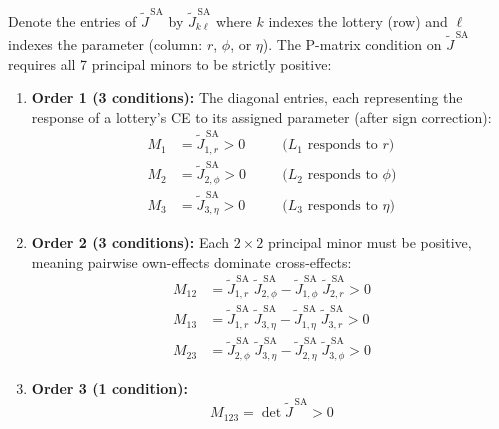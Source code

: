 \documentclass[11pt,a4paper]{article}
\theoremstyle{definition}
\begin{document}
Denote the entries of $\widetilde{J}^{\,\mathrm{SA}}$ by
$\widetilde{J}^{\,\mathrm{SA}}_{k\ell}$ where $k$ indexes the lottery
(row) and $\ell$ indexes the parameter (column: $r$, $\phi$, or $\eta$).
The P-matrix condition on $\widetilde{J}^{\,\mathrm{SA}}$ requires all 7
principal minors to be strictly positive:
\begin{enumerate}
    \item \textbf{Order 1 (3 conditions):} The diagonal entries, each
    representing the response of a lottery's CE to its assigned parameter
    (after sign correction):
    \begin{align}
        M_1 &= \widetilde{J}^{\,\mathrm{SA}}_{1,r} > 0
        &\quad&\text{($L_1$ responds to $r$)} \\
        M_2 &= \widetilde{J}^{\,\mathrm{SA}}_{2,\phi} > 0
        &\quad&\text{($L_2$ responds to $\phi$)} \\
        M_3 &= \widetilde{J}^{\,\mathrm{SA}}_{3,\eta} > 0
        &\quad&\text{($L_3$ responds to $\eta$)}
    \end{align}

    \item \textbf{Order 2 (3 conditions):} Each $2 \times 2$ principal
    minor must be positive, meaning pairwise own-effects dominate
    cross-effects:
    \begin{align}
        M_{12} &= \widetilde{J}^{\,\mathrm{SA}}_{1,r}\;
                   \widetilde{J}^{\,\mathrm{SA}}_{2,\phi}
                 - \widetilde{J}^{\,\mathrm{SA}}_{1,\phi}\;
                   \widetilde{J}^{\,\mathrm{SA}}_{2,r} > 0 \\
        M_{13} &= \widetilde{J}^{\,\mathrm{SA}}_{1,r}\;
                   \widetilde{J}^{\,\mathrm{SA}}_{3,\eta}
                 - \widetilde{J}^{\,\mathrm{SA}}_{1,\eta}\;
                   \widetilde{J}^{\,\mathrm{SA}}_{3,r} > 0 \\
        M_{23} &= \widetilde{J}^{\,\mathrm{SA}}_{2,\phi}\;
                   \widetilde{J}^{\,\mathrm{SA}}_{3,\eta}
                 - \widetilde{J}^{\,\mathrm{SA}}_{2,\eta}\;
                   \widetilde{J}^{\,\mathrm{SA}}_{3,\phi} > 0
    \end{align}

    \item \textbf{Order 3 (1 condition):}
    \begin{equation}
        M_{123} = \det \widetilde{J}^{\,\mathrm{SA}} > 0
    \end{equation}
\end{enumerate}
\end{document}
